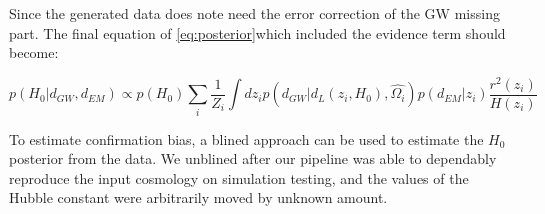 Since the generated data does note need the error correction of the GW missing part.  The final equation of \ref{eq:posterior}which included the evidence term should become:
\begin{widetext}
\begin{equation}
     p(H_0|d_{GW}, d_{EM})\propto p(H_0) \sum_i \frac{1}{Z_i}\int dz_i p(d_{GW}|d_L(z_i, H_0), \hat{\Omega_{i}})p(d_{EM}|z_i)\frac{r^2 (z_i)}{H(z_i)}
    \label{eq: finaleq}
\end{equation}
\end{widetext}
To estimate confirmation bias, a blined approach can be used to estimate the $H_0$ posterior from the data. We unblined after our pipeline was able to dependably reproduce the input cosmology on simulation testing, and the values of the Hubble constant were arbitrarily moved by unknown amount. 
